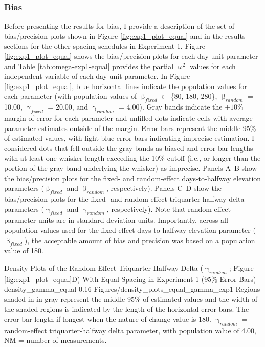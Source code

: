 \documentclass[
12pt, %
twoside,
english]{guelphthesis}
\begin{document}
\hypertarget{bias-equal-exp1}{%
\subsubsection{Bias}\label{bias-equal-exp1}}

Before presenting the results for bias, I provide a description of the set of bias/precision plots shown in Figure \ref{fig:exp1_plot_equal} and in the results sections for the other spacing schedules in Experiment 1. Figure \ref{fig:exp1_plot_equal} shows the bias/precision plots for each day-unit parameter and Table \ref{tab:omega-exp1-equal} provides the partial \(\upomega^2\) values for each independent variable of each day-unit parameter. In Figure \ref{fig:exp1_plot_equal}, blue horizontal lines indicate the population values for each parameter (with population values of \(\upbeta_{fixed} \in\) \{80, 180, 280\}, \(\upbeta_{random}\) = 10.00, \(\upgamma_{fixed}\) = 20.00, and \(\upgamma_{random}\) = 4.00). Gray bands indicate the \(\pm 10\%\) margin of error for each parameter and unfilled dots indicate cells with average parameter estimates outside of the margin. Error bars represent the middle 95\% of estimated values, with light blue error bars indicating imprecise estimation. I considered dots that fell outside the gray bands as biased and error bar lengths with at least one whisker length exceeding the 10\% cutoff (i.e., or longer than the portion of the gray band underlying the whisker) as imprecise. Panels A--B show the bias/precision plots for the fixed- and random-effect days-to-halfway elevation parameters (\(\upbeta_{fixed}\) and \(\upbeta_{random}\), respectively). Panels C--D show the bias/precision plots for the fixed- and random-effect triquarter-halfway delta parameters (\(\upgamma_{fixed}\) and \(\upgamma_{random}\), respectively). Note that random-effect parameter units are in standard deviation units. Importantly, across all population values used for the fixed-effect days-to-halfway elevation parameter (\(\upbeta_{fixed}\)), the acceptable amount of bias and precision was based on a population value of 180.
\begin{apaFigure}
[portrait]
[samepage]
[0cm]
{Density Plots of the Random-Effect Triquarter-Halfway Delta ($\upgamma_{random}$; Figure \ref{fig:exp1_plot_equal}D) With Equal Spacing in Experiment 1 (95\% Error Bars)}
{density_gamma_equal}
{0.16}
{Figures/density_plots_equal_gamma_exp1}
{Regions shaded in in gray represent the middle 95\% of estimated values and the width of the shaded regions is indicated by the length of the horizontal error bars. The error bar length if longest when the nature-of-change value is 180. $\upgamma_{random}$ = random-effect triquarter-halfway delta parameter, with population value of 4.00, NM = number of measurements.}
\end{apaFigure}
\end{document}
